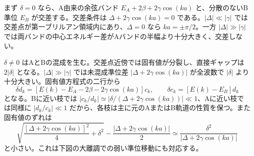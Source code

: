 \documentclass[11pt,a4paper]{article}
\begin{document}
まず $\delta=0$ なら、A由来の余弦バンド $E_A+2\beta+2\gamma\cos(ka)$ と、分散のないB準位 $E_B$ が交差する。交差条件は $\Delta+2\gamma\cos(ka)=0$ である。$|\Delta|\ll|\gamma|$ では交差点が第一ブリルアン領域内にあり、$\Delta=0$ なら $ka=\pm\pi/2$。一方 $|\Delta|\gg|\gamma|$ では両バンドの中心エネルギー差がAバンドの半幅より十分大きく、交差しない。

$\delta\ne0$ はAとBの混成を生む。交差点近傍では固有値が分裂し、直接ギャップは $2|\delta|$ となる。$|\Delta|\gg|\gamma|$ では未混成準位差 $|\Delta+2\gamma\cos(ka)|$ が全波数で $|\delta|$ より十分大きい。固有値方程式の二行から
\begin{equation}
 \delta d_k=[E(k)-E_A-2\beta-2\gamma\cos(ka)]c_k,
 \qquad \delta c_k=[E(k)-E_B]d_k
\end{equation}
となる。Bに近い枝では $|c_k/d_k|\simeq|\delta/(\Delta+2\gamma\cos(ka))|\ll1$、Aに近い枝では同様に $|d_k/c_k|\ll1$ だから、各枝は主に元のAまたはB軌道の性質を保つ。また固有値のずれは
\begin{equation}
 \sqrt{\frac{[\Delta+2\gamma\cos(ka)]^2}{4}+\delta^2}
 -\frac{|\Delta+2\gamma\cos(ka)|}{2}
 \simeq\frac{\delta^2}{|\Delta+2\gamma\cos(ka)|}
\end{equation}
と小さい。これは下図の大離調での弱い準位移動にも対応する。
\end{document}
